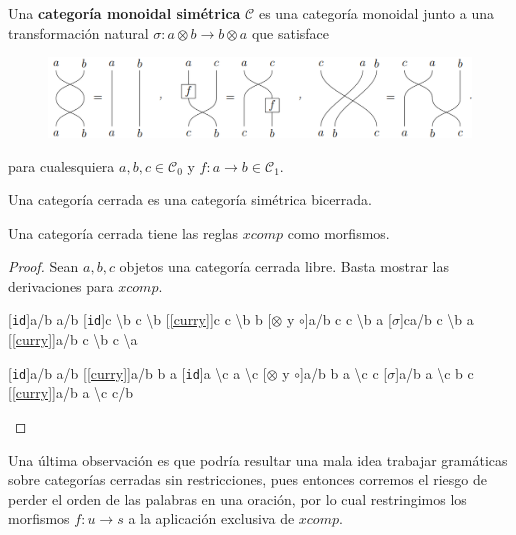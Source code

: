\documentclass[../main.tex]{subfiles}
\begin{document}
	\begin{dfn}
		Una \textbf{categoría monoidal simétrica} $\mathcal{C}$ es una categoría monoidal junto a una transformación natural $\sigma:a\otimes b \to b \otimes a$ que satisface  
		\begin{figure}[H]
			\includegraphics[scale=.5]{diagrama/swap.png}
			\centering
		\end{figure}
		para cualesquiera $a,b,c \in \mathcal{C}_0$ y $f:a \to b \in \mathcal{C}_1$.
	\end{dfn} 
	
	\begin{dfn}
		Una categoría cerrada es una categoría simétrica bicerrada.
	\end{dfn}
	
	\begin{prop}
		Una categoría cerrada tiene las reglas $xcomp$ como morfismos.
	\end{prop}
	\begin{proof}
		Sean $a,b,c$ objetos una categoría cerrada libre. Basta mostrar las derivaciones para $xcomp$.
		\begin{multicols}{2}
		\begin{prooftree}
			[{\tt{id}}]{a/b \to a/b}
			[{\tt{id}}]{c \backslash b \to c \backslash b}
			[\ref{curry}]{c \otimes c \backslash b \to b}
			[$\otimes$ y $\circ$]{a/b \otimes c \otimes c \backslash b \to a}
			[$\sigma$]{c\otimes a/b \otimes c \backslash b \to a}
			[\ref{curry}]{a/b \otimes c \backslash b \to c \backslash a}
		\end{prooftree}
			\begin{prooftree}
				\hypo{a/b}
				[{\tt{id}}]{a/b \to a/b}
				[\ref{curry}]{a/b \otimes b \to a}
				\hypo{a \backslash c}
				[{\tt{id}}]{a \backslash c \to a \backslash c}
				[$\otimes$ y $\circ$]{a/b \otimes b \otimes a \backslash c \to c}
				[$\sigma$]{a/b \otimes a \backslash c \otimes b \to c}
				[\ref{curry}]{a/b \otimes a \backslash c \to c/b}
			\end{prooftree}
		\end{multicols}
		
	\end{proof}
	
	Una última observación es que podría resultar una mala idea trabajar gramáticas sobre categorías cerradas sin restricciones, pues entonces corremos el riesgo de perder el orden de las palabras en una oración, por lo cual restringimos los morfismos $f:u \to s$ a la aplicación exclusiva de $\textit{xcomp}$. \\
	
\end{document}
